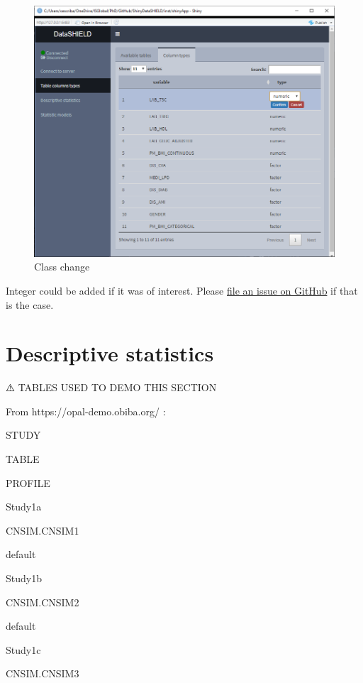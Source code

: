 \documentclass[
]{book}
\begin{document}
\begin{figure}

{\centering \includegraphics[width=12.67in]{images/table_columns_2} 

}

\caption{Class change}\label{fig:tableclass2}
\end{figure}

Integer could be added if it was of interest. Please \href{https://github.com/isglobal-brge/ShinyDataSHIELD/issues}{file an issue on GitHub} if that is the case.

\hypertarget{descriptive-statistics}{%
\section{Descriptive statistics}\label{descriptive-statistics}}

⚠️ TABLES USED TO DEMO THIS SECTION

From https://opal-demo.obiba.org/ :

STUDY

TABLE

PROFILE

Study1a

CNSIM.CNSIM1

default

Study1b

CNSIM.CNSIM2

default

Study1c

CNSIM.CNSIM3
\end{document}
